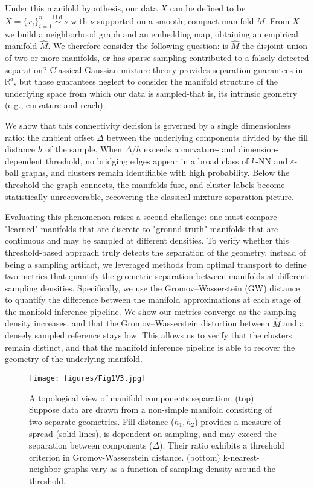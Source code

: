 \documentclass{article}
\theoremstyle{plain}
\theoremstyle{definition}
\theoremstyle{remark}
\begin{document}
Under this manifold hypothesis, our data $X$ can be defined to be $X=\{x_i\}_{i=1}^n\stackrel{\text{i.i.d.}}{\sim}\nu$ with $\nu$ supported on a smooth, compact manifold $M$. From $X$ we build a neighborhood graph and an embedding map, obtaining an empirical manifold $\widehat{M}$. We therefore consider the following question: is $\widehat{M}$ the disjoint union of two or more manifolds, or has sparse sampling contributed to a falsely detected separation? 
Classical Gaussian-mixture theory provides separation guarantees in $\mathbb{R}^d$, but those guarantees neglect to consider the manifold structure of the underlying space from which our data is sampled-that is, its intrinsic geometry (e.g., curvature and reach).

We show that this connectivity decision is governed by a single dimensionless ratio: the ambient offset $\Delta$ between the underlying components divided by the fill distance $h$ of the sample. When $\Delta/h$ exceeds a curvature- and dimension-dependent threshold, no bridging edges appear in a broad class of $k$-NN and $\varepsilon$-ball graphs, and clusters remain identifiable with high probability. Below the threshold the graph connects, the manifolds fuse, and cluster labels become statistically unrecoverable, recovering the classical mixture-separation picture.

Evaluating this phenomenon raises a second challenge: one must compare "learned" manifolds that are discrete to "ground truth" manifolds that are continuous and may be sampled at different densities. To verify whether this threshold-based approach truly detects the separation of the geometry, instead of being a sampling artifact, we leveraged methods from optimal transport to define two metrics that quantify the geometric separation between manifolds at different sampling densities. Specifically, we use the Gromov–Wasserstein (GW) distance to quantify the difference between the manifold approximations at each stage of the manifold inference pipeline. We show our metrics converge as the sampling density increases, and that the Gromov–Wasserstein distortion between $\widehat{M}$ and a densely sampled reference stays low. This allows us to verify that the clusters remain distinct, and that the manifold inference pipeline is able to recover the geometry of the underlying manifold.

\begin{figure}[t]
    \centering
    \texttt{[image: figures/Fig1V3.jpg]}
    \caption{A topological view of manifold components separation. (top) Suppose data are drawn from a non-simple manifold consisting of two separate geometries. Fill distance ($h_1, h_2$) provides a measure of spread (solid lines), is dependent on sampling, and may exceed the separation between components ($\Delta$). Their ratio exhibits a threshold criterion in Gromov-Wasserstein distance. (bottom) k-nearest-neighbor graphs vary as a function of sampling density around the threshold.
    }
    \label{fig:manifold_sampling}
\end{figure}
\end{document}
